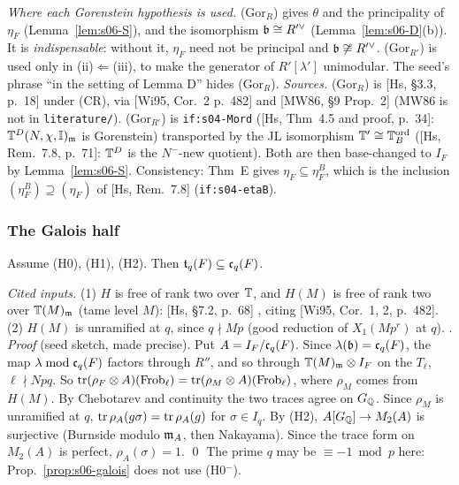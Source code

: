 \noindent\emph{Where each Gorenstein hypothesis is used.} (Gor$_R$) gives $\theta$ and the principality of $\eta_F$
(Lemma~\ref{lem:s06-S}), and the isomorphism $\mathfrak{b}\cong R'^\vee$ (Lemma~\ref{lem:s06-D}(b)). It is \emph{indispensable}: without it,
$\eta_F$ need not be principal and $\mathfrak{b}\not\cong R'^\vee$. (Gor$_{R'}$) is used only in (ii)$\Leftarrow$(iii), to make the
generator of $R'[\lambda']$ unimodular. The seed's phrase ``in the setting of Lemma D'' hides (Gor$_R$).
\emph{Sources.} (Gor$_R$) is [Hs, \S3.3, p.~18] 
\stcited{} under (CR), via [Wi95, Cor.~2 p.~482] and [MW86, \S9 Prop.~2] (MW86 is not in \texttt{literature/}). (Gor$_{R'}$) is
\texttt{if:s04-Mord} ([Hs, Thm~4.5 and proof, p.~34]: $\mathbb{T}^D(N,\chi,\mathbb I)_{\mathfrak{m}}$ is Gorenstein) transported by the JL isomorphism
$\mathbb{T}'\cong\mathbb{T}^{\mathrm{ord}}_B$ ([Hs, Rem.~7.8, p.~71]: $\mathbb{T}^D$ is the $N^-$-new quotient). Both are then base-changed to $I_F$ by
Lemma~\ref{lem:s06-S}. Consistency: Thm~E gives $\eta_F\subseteq\eta^B_F$, which is the inclusion $(\eta^B_F)\supseteq(\eta_F)$
of [Hs, Rem.~7.8] (\texttt{if:s04-etaB}).

\subsubsection{The Galois half}
\begin{proposition}\label{prop:s06-galois}
Assume (H0), (H1), (H2). Then $\mathfrak{t}_q(F)\subseteq\mathfrak{c}_q(F)$. \stpmc{}
\end{proposition}
\noindent\emph{Cited inputs.} (1) $H$ is free of rank two over $\mathbb{T}$, and $H(M)$ is free of rank two over $\mathbb{T}(M)_{\mathfrak{m}}$ (tame level $M$):
[Hs, \S7.2, p.~68]  \stcited{}, citing [Wi95, Cor.~1, 2, p.~482]. (2)
$H(M)$ is unramified at $q$, since $q\nmid Mp$ (good reduction of $X_1(Mp^r)$ at $q$). \stknown.
\emph{Proof} (seed sketch, made precise). Put $A=I_F/\mathfrak{c}_q(F)$. Since $\lambda(\mathfrak{b})=\mathfrak{c}_q(F)$, the map $\lambda\bmod\mathfrak{c}_q(F)$ factors
through $R''$, and so through $\mathbb{T}(M)_{\mathfrak{m}}\otimes I_F$ on the $T_\ell$, $\ell\nmid Npq$. So $\operatorname{tr}(\rho_F\otimes A)(\mathrm{Frob}_\ell)
=\operatorname{tr}(\rho_M\otimes A)(\mathrm{Frob}_\ell)$, where $\rho_M$ comes from $H(M)$. By Chebotarev and continuity the two traces agree on
$G_{\mathbb{Q}}$. Since $\rho_M$ is unramified at $q$, $\operatorname{tr}\rho_A(g\sigma)=\operatorname{tr}\rho_A(g)$ for $\sigma\in I_q$. By (H2), $A[G_{\mathbb{Q}}]\to M_2(A)$ is
surjective (Burnside modulo $\mathfrak{m}_A$, then Nakayama). Since the trace form on $M_2(A)$ is perfect, $\rho_A(\sigma)=1$. \qed
\noindent The prime $q$ may be $\equiv-1\bmod p$ here: Prop.~\ref{prop:s06-galois} does not use (H0$^-$).

